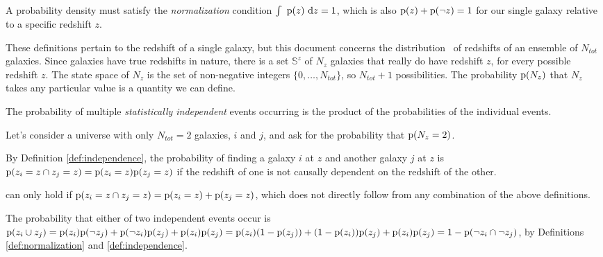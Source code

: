 \begin{definition}\label{def:normalization}
	A probability density must satisfy the \textit{normalization} condition $\int\ \mathrm{p}(z)\ \mathrm{d} z = 1$, which is also $\mathrm{p}(z) + \mathrm{p}(\lnot z) = 1$ for our single galaxy relative to a specific redshift $z$.
\end{definition}

These definitions pertain to the redshift of a single galaxy, but this document concerns the distribution \Nz\ of redshifts of an ensemble of $N_{tot}$ galaxies.
Since galaxies have true redshifts in nature, there is a set $\mathbb{S}^{z}$ of $N_{z}$ galaxies that really do have redshift $z$, for every possible redshift $z$.
The state space of $N_{z}$ is the set of non-negative integers $\{0, \dots, N_{tot}\}$, so $N_{tot} + 1$ possibilities.
The probability $\mathrm{p}(N_{z})$ that $N_{z}$ takes any particular value is a quantity we can define.

\begin{definition}\label{def:independence}
	The probability of multiple \textit{statistically independent} events occurring is the product of the probabilities of the individual events.
\end{definition}

Let's consider a universe with only $N_{tot} = 2$ galaxies, $i$ and $j$, and ask for the probability that $\mathrm{p}(N_{z} = 2)$.

\begin{lemma}\label{lem:independence}
	By Definition \ref{def:independence}, the probability of finding a galaxy $i$ at $z$ and another galaxy $j$ at $z$ is $\mathrm{p}(z_{i} = z \cap z_{j} = z) = \mathrm{p}(z_{i} = z) \mathrm{p}(z_{j} = z)$ if the redshift of one is not causally dependent on the redshift of the other.
\end{lemma}

 can only hold if $\mathrm{p}(z_{i} = z \cap z_{j} = z) = \mathrm{p}(z_{i} = z) + \mathrm{p}(z_{j} = z)$, which does not directly follow from any combination of the above definitions.

\begin{proposition}\label{prp:union}
	The probability that either of two independent events occur is $\mathrm{p}(z_{i} \cup z_{j}) = \mathrm{p}(z_{i}) \mathrm{p}(\lnot z_{j}) + \mathrm{p}(\lnot z_{i}) \mathrm{p}(z_{j}) + \mathrm{p}(z_{i}) \mathrm{p}(z_{j}) = \mathrm{p}(z_{i}) (1 - \mathrm{p}(z_{j})) + (1 - \mathrm{p}(z_{i})) \mathrm{p}(z_{j}) + \mathrm{p}(z_{i}) \mathrm{p}(z_{j}) = 1 - \mathrm{p}(\lnot z_{i} \cap \lnot z_{j})$, by Definitions \ref{def:normalization} and \ref{def:independence}.
\end{proposition}

